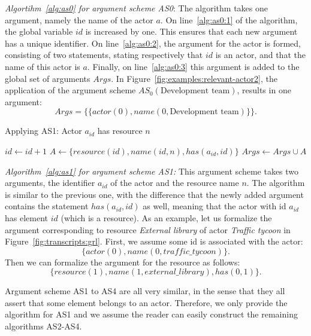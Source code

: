 \emph{Algortihm~\ref{alg:as0} for argument scheme AS0}: The algorithm takes one argument, namely the name of the actor $a$. On line~\ref{alg:as0:1} of the algorithm, the global variable $id$ is increased by one. This ensures that each new argument has a unique identifier. On line~\ref{alg:as0:2}, the argument for the actor is formed, consisting of two statements, stating respectively that $id$ is an actor, and that the name of this actor is $a$. Finally, on line~\ref{alg:as0:3} this argument is added to the global set of arguments $Args$. In Figure~\ref{fig:examples:relevant-actor2}, the application of the argument scheme $AS_0(\text{Development team})$, results in one argument: $$Args = \{\{actor(0), name(0, \text{Development team})\}\}.$$

\begin{algorithm}[h]
  \caption{Applying AS1: Actor $a_{id}$ has resource $n$}\label{alg:as1}
  \begin{algorithmic}[1]
    \State $id\gets id+1$
    \State $A\gets \{resource(id), name(id,n), has(a_{id},id)\}$
    \State $Args \gets Args\cup A$
    \EndProcedure
  \end{algorithmic}
\end{algorithm}

\emph{Algorithm~\ref{alg:as1} for argument scheme AS1:} This argument scheme takes two arguments, the identifier $a_{id}$ of the actor and the resource name $n$. The algorithm is similar to the previous one, with the difference that the newly added argument contains the statement $has(a_{id},id)$ as well, meaning that the actor with id $a_{id}$ has element $id$ (which is a resource). As an example, let us formalize the argument corresponding to resource \emph{External library} of actor \emph{Traffic tycoon} in Figure~\ref{fig:transcripts:grl}. First, we assume some id is associated with the actor: $$\{actor(0),name(0,traffic\_tycoon)\}.$$ Then we can formalize the argument for the resource as follows: $$\{resource(1),name(1,external\_library),has(0,1)\}.$$

Argument scheme AS1 to AS4 are all very similar, in the sense that they all assert that some element belongs to an actor. Therefore, we only provide the algorithm for AS1 and we assume the reader can easily construct the remaining algorithms AS2-AS4.

